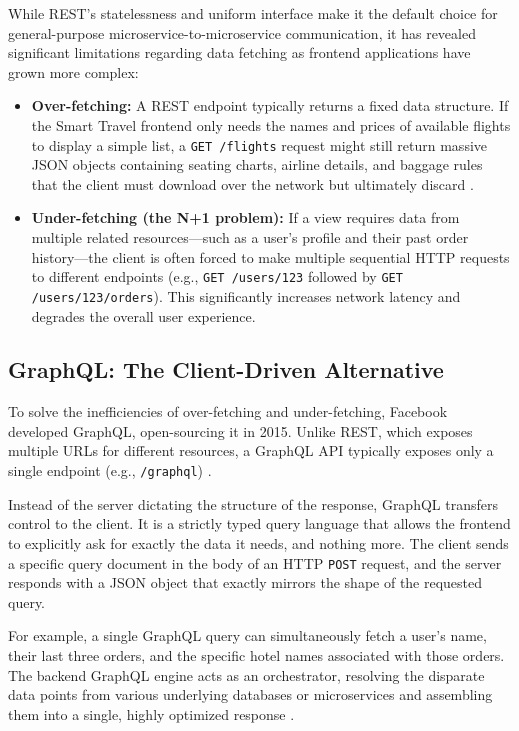 While REST's statelessness and uniform interface make it the default choice for general-purpose microservice-to-microservice communication, it has revealed significant limitations regarding data fetching as frontend applications have grown more complex:
\begin{itemize}
    \item \textbf{Over-fetching:} A REST endpoint typically returns a fixed data structure. If the Smart Travel frontend only needs the names and prices of available flights to display a simple list, a \texttt{GET /flights} request might still return massive JSON objects containing seating charts, airline details, and baggage rules that the client must download over the network but ultimately discard \cite{ibm_rest_vs_graphql}.
    \item \textbf{Under-fetching (the N+1 problem):} If a view requires data from multiple related resources—such as a user's profile and their past order history—the client is often forced to make multiple sequential HTTP requests to different endpoints (e.g., \texttt{GET /users/123} followed by \texttt{GET /users/123/orders}). This significantly increases network latency and degrades the overall user experience.
\end{itemize}

\subsection{GraphQL: The Client-Driven Alternative}

To solve the inefficiencies of over-fetching and under-fetching, Facebook developed GraphQL, open-sourcing it in 2015. Unlike REST, which exposes multiple URLs for different resources, a GraphQL API typically exposes only a single endpoint (e.g., \texttt{/graphql}) \cite{apollo_graphql_basics}.

Instead of the server dictating the structure of the response, GraphQL transfers control to the client. It is a strictly typed query language that allows the frontend to explicitly ask for exactly the data it needs, and nothing more. The client sends a specific query document in the body of an HTTP \texttt{POST} request, and the server responds with a JSON object that exactly mirrors the shape of the requested query.

For example, a single GraphQL query can simultaneously fetch a user's name, their last three orders, and the specific hotel names associated with those orders. The backend GraphQL engine acts as an orchestrator, resolving the disparate data points from various underlying databases or microservices and assembling them into a single, highly optimized response \cite{ibm_rest_vs_graphql}.

